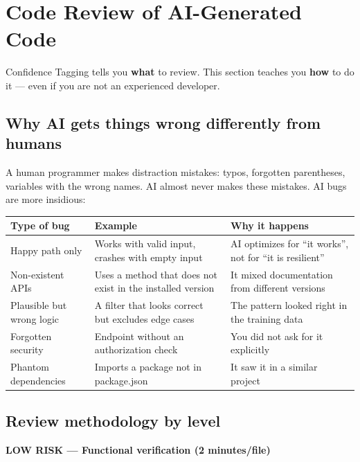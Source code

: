 \section{Code Review of AI-Generated Code}

Confidence Tagging tells you \textbf{what} to review. This section teaches you \textbf{how} to do it --- even if you are not an experienced developer.

\subsection{Why AI gets things wrong differently from humans}

A human programmer makes distraction mistakes: typos, forgotten parentheses, variables with the wrong names. AI almost never makes these mistakes. AI bugs are more insidious:

\begin{center}
\begin{small}
\begin{tabularx}{\textwidth}{l l X}
\toprule
\textbf{Type of bug} & \textbf{Example} & \textbf{Why it happens} \\
\midrule
Happy path only & Works with valid input, crashes with empty input & AI optimizes for ``it works'', not for ``it is resilient'' \\
Non-existent APIs & Uses a method that does not exist in the installed version & It mixed documentation from different versions \\
Plausible but wrong logic & A filter that looks correct but excludes edge cases & The pattern looked right in the training data \\
Forgotten security & Endpoint without an authorization check & You did not ask for it explicitly \\
Phantom dependencies & Imports a package not in package.json & It saw it in a similar project \\
\bottomrule
\end{tabularx}
\end{small}
\end{center}

\subsection{Review methodology by level}

\textbf{\textcolor{green!60!black}{LOW RISK} --- Functional verification (2 minutes/file)}

